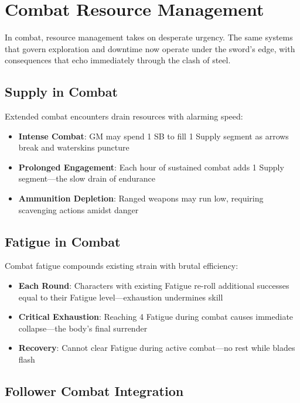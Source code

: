 \section*{Combat Resource Management}

In combat, resource management takes on desperate urgency. The same systems that govern exploration and downtime now operate under the sword's edge, with consequences that echo immediately through the clash of steel.

\subsection*{Supply in Combat}

Extended combat encounters drain resources with alarming speed:

\begin{itemize}
    \item \textbf{Intense Combat}: GM may spend 1 SB to fill 1 Supply segment as arrows break and waterskins puncture
    \item \textbf{Prolonged Engagement}: Each hour of sustained combat adds 1 Supply segment—the slow drain of endurance
    \item \textbf{Ammunition Depletion}: Ranged weapons may run low, requiring scavenging actions amidst danger
\end{itemize}

\subsection*{Fatigue in Combat}

Combat fatigue compounds existing strain with brutal efficiency:

\begin{itemize}
    \item \textbf{Each Round}: Characters with existing Fatigue re-roll additional successes equal to their Fatigue level—exhaustion undermines skill
    \item \textbf{Critical Exhaustion}: Reaching 4 Fatigue during combat causes immediate collapse—the body's final surrender
    \item \textbf{Recovery}: Cannot clear Fatigue during active combat—no rest while blades flash
\end{itemize}

\subsection*{Follower Combat Integration}

